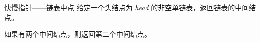 
\begin{example}{快慢指针——链表中点}
给定一个头结点为 \textsl{head} 的非空单链表，返回链表的中间结点。

如果有两个中间结点，则返回第二个中间结点。
\end{example}